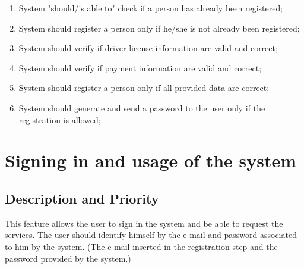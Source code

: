 \documentclass{scrreprt}
\begin{document}
\begin{enumerate}[label=R\arabic*., start=1]
\item System "should/is able to" check if a person has already been registered;
\item System should register a person only if he/she is not already been registered;
\item System should verify if driver license information are valid and correct;
\item System should verify if payment information are valid and correct;
\item System should register a person only if all provided data are correct;
\item System should generate and send a password to the user only if the registration is allowed;
\end{enumerate}

\begin{comment}$<$Itemize the detailed functional requirements associated with this feature.  
These are the software capabilities that must be present in order for the user 
to carry out the services provided by the feature, or to execute the use case.  
Include how the product should respond to anticipated error conditions or 
invalid inputs. Requirements should be concise, complete, unambiguous, 
verifiable, and necessary. Use “TBD” as a placeholder to indicate when necessary 
information is not yet available.$>$
\end{comment}

\begin{comment}$<$Each requirement should be uniquely identified with a sequence number or a 
meaningful tag of some kind.$>$

REQ-1:	REQ-2:
\end{comment}

\section{Signing in and usage of the system}
\subsection{Description and Priority}
This feature allows the user to sign in the system and be able to request the services.
The user should identify himself by the e-mail and password associated to him by the system.
(The e-mail inserted in the registration step and the password provided by the system.)
\end{document}
